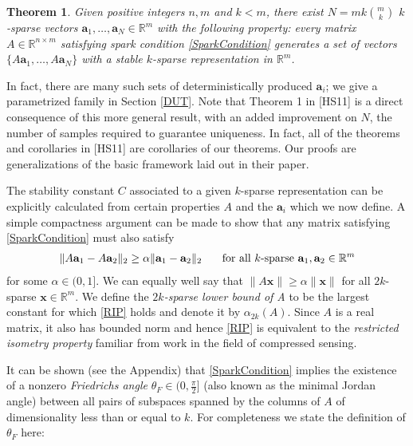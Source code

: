 \documentclass[journal, onecolumn]{IEEEtran}
\newtheorem{theorem}{Theorem}
\begin{document}

\begin{theorem}\label{DeterministicUniquenessTheorem}
Given positive integers $n, m$ and $k < m$, there exist $N =  mk{m \choose k}$ $k$-sparse vectors $\mathbf{a}_1, \ldots, \mathbf{a}_N \in \mathbb{R}^m$ with the following property: every matrix $A \in \mathbb{R}^{n \times m}$ satisfying spark condition \eqref{SparkCondition} generates a set of vectors $\{A\mathbf{a}_1, \ldots, A\mathbf{a}_N\}$ with a stable $k$-sparse representation in $\mathbb{R}^m$.
\end{theorem}

In fact, there are many such sets of deterministically produced $\mathbf{a}_i$; we give a parametrized family in Section \ref{DUT}. Note that Theorem 1 in [HS11] is a direct consequence of this more general result, with an added improvement on $N$, the number of samples required to guarantee uniqueness. In fact, all of the theorems and corollaries in [HS11] are corollaries of our theorems. Our proofs are generalizations of the basic framework laid out in their paper.

The stability constant $C$ associated to a given $k$-sparse representation can be explicitly calculated from certain properties $A$ and the $\mathbf{a}_i$ which we now define. A simple compactness argument can be made to show that any matrix satisfying \eqref{SparkCondition} must also satisfy
\begin{align}\label{RIP}
\|A\mathbf{a}_1 - A\mathbf{a}_2 \|_2 \geq  \alpha \|\mathbf{a}_1 - \mathbf{a}_2\|_2 \indent \text{ for all $k$-sparse } \mathbf{a}_1, \mathbf{a}_2 \in \mathbb{R}^m
\end{align}
%
for some $\alpha \in (0,1]$. We can equally well say that $\|A\mathbf{x}\| \geq \alpha\|\mathbf{x}\|$ for all $2k$-sparse $\mathbf{x} \in \mathbb{R}^m$. We define the \emph{$2k$-sparse lower bound of A} to be the largest constant for which \eqref{RIP} holds and denote it by $\alpha_{2k}(A)$. Since $A$ is a real matrix, it also has bounded norm and hence \eqref{RIP} is equivalent to the \emph{restricted isometry property} \cite{CandesTao05} familiar from work in the field of compressed sensing.

It can be shown (see the Appendix) that \eqref{SparkCondition} implies the existence of a nonzero \emph{Friedrichs angle} $\theta_F \in (0,\frac{\pi}{2}]$ (also known as the minimal Jordan angle) between all pairs of subspaces spanned by the columns of $A$ of dimensionality less than or equal to $k$. For completeness we state the definition of $\theta_F$ here:
\end{document}
